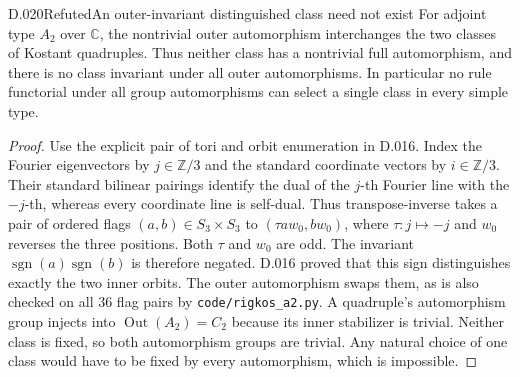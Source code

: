 \begin{saresult}{D.020}{Refuted}{An outer-invariant distinguished class need not exist}
For adjoint type $A_2$ over $\mathbb C$, the nontrivial outer
automorphism interchanges the two classes of Kostant
quadruples.  Thus neither class has a nontrivial full
automorphism, and there is no class invariant under all
outer automorphisms.  In particular no rule functorial
under all group automorphisms can select a single class
in every simple type.
\end{saresult}
\begin{proof}
Use the explicit pair of tori and orbit enumeration in
D.016.  Index the Fourier eigenvectors by $j\in\mathbb Z/3$
and the standard coordinate vectors by $i\in\mathbb Z/3$.
Their standard bilinear pairings identify the dual of
the $j$-th Fourier line with the $-j$-th, whereas every
coordinate line is self-dual.  Thus transpose-inverse
takes a pair of ordered flags $(a,b)\in S_3\times S_3$
to $(\tau a w_0,bw_0)$, where $\tau:j\mapsto-j$ and
$w_0$ reverses the three positions.  Both $\tau$ and
$w_0$ are odd.  The invariant
$\operatorname{sgn}(a)\operatorname{sgn}(b)$ is therefore
negated.  D.016 proved that this sign distinguishes
exactly the two inner orbits.  The outer automorphism
swaps them, as is also checked on all 36 flag pairs by
\texttt{code/rigkos\_a2.py}.  A quadruple's automorphism
group injects into $\operatorname{Out}(A_2)=C_2$ because
its inner stabilizer is trivial.  Neither class is fixed,
so both automorphism groups are trivial.  Any natural
choice of one class would have to be fixed by every
automorphism, which is impossible.
\end{proof}

